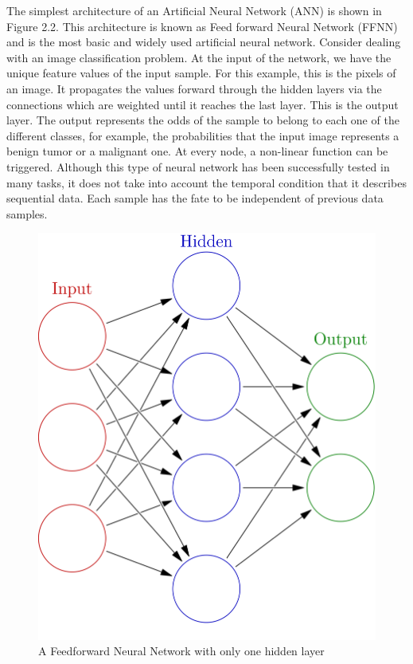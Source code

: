 The simplest architecture of an Artificial Neural Network (ANN) is shown in Figure 2.2.
This architecture is known as Feed forward Neural Network (FFNN) and is the most basic and widely used artificial neural network.
Consider dealing with an image classification problem.
At the input of the network, we have the unique feature values of the input sample.
For this example, this is the pixels of an image.
It propagates the values forward through the hidden layers via the connections which are weighted until it reaches the last layer.
This is the output layer.
The output represents the odds of the sample to belong to each one of the different classes, for example,
the probabilities that the input image represents a benign tumor or a malignant one.
At every node, a non-linear function can be triggered.
Although this type of neural network has been successfully tested in many tasks, it does not take into account the
temporal condition that it describes sequential data.
Each sample has the fate to be independent of previous data samples.

\begin{figure}[H]
    \centering
    \includegraphics[scale=.20]{./images/background/simplefnn.png}
    \caption{A Feedforward Neural Network with only one hidden layer}
    \label{fig:ffnn_fig}
\end{figure}

